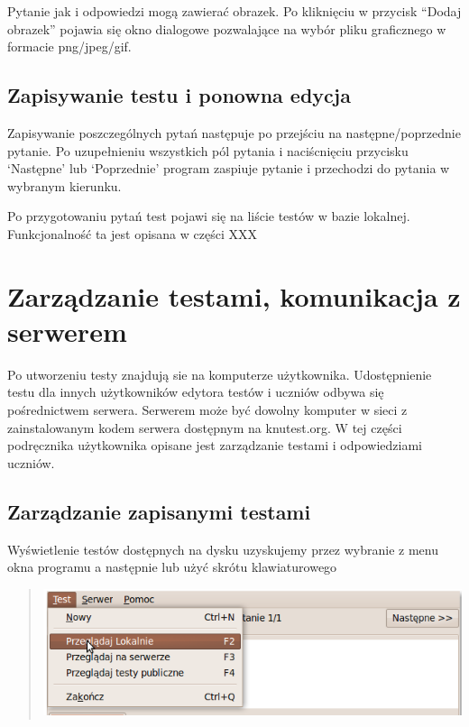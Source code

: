 \documentclass[letterpaper,10pt,polish]{sphinxmanual}
\begin{document}
Pytanie jak i odpowiedzi mogą zawierać obrazek. Po kliknięciu w przycisk ``Dodaj obrazek'' pojawia się okno dialogowe pozwalające na wybór pliku graficznego w formacie png/jpeg/gif.


\section{Zapisywanie testu i ponowna edycja}
\label{index:zapisywanie-testu}\label{index:zapisywanie-testu-i-ponowna-edycja}
Zapisywanie poszczególnych pytań następuje po przejściu na następne/poprzednie pytanie. Po uzupełnieniu wszystkich pól pytania i naciścnięciu przycisku `Następne' lub `Poprzednie' program zaspiuje pytanie i przechodzi do pytania w wybranym kierunku.

Po przygotowaniu pytań test pojawi się na liście testów w bazie lokalnej. Funkcjonalność ta jest opisana w części XXX


\chapter{Zarządzanie testami, komunikacja z serwerem}
\label{index:zarzadzanie-testami}\label{index:zarzadzanie-testami-komunikacja-z-serwerem}
Po utworzeniu testy znajdują sie na komputerze użytkownika. Udostępnienie testu dla innych użytkowników edytora testów i uczniów odbywa się pośrednictwem serwera. Serwerem może być dowolny komputer w sieci z zainstalowanym kodem serwera dostępnym na knutest.org.
W tej części podręcznika użytkownika opisane jest zarządzanie testami i odpowiedziami uczniów.


\section{Zarządzanie zapisanymi testami}
\label{index:zarzadzanie-zapisanymi-testami}\label{index:zarzadzanie-zapisanymi}
Wyświetlenie testów dostępnych na dysku uzyskujemy przez wybranie z menu okna programu  a następnie  lub użyć skrótu klawiaturowego 
\begin{quote}

\includegraphics{PrzegladajLokalnie.png}
\end{quote}
\end{document}
